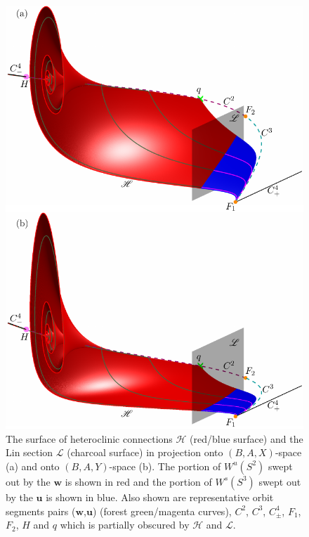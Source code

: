 \documentclass{ws-ijbc}
\begin{document}
\begin{figure}[H]
\centering
\includegraphics[]{./figures/MKMO_11.pdf}
\caption{The surface of heteroclinic connections $\mathscr{H}$ (red/blue surface) and the Lin section $\mathscr{L}$ (charcoal surface) in projection onto $(B,A,X)$-space (a) and onto $(B,A,Y)$-space (b).  The portion of $W^u(S^2)$ swept out by the $\mathbf{w}$ is shown in red and the portion of $W^s(S^3)$ swept out by the $\mathbf{u}$ is shown in blue.  Also shown are representative orbit segments pairs ($\mathbf{w}$,$\mathbf{u}$) (forest green/magenta curves), $C^2$, $C^3$, $C^4_\pm$, $F_1$, $F_2$, $H$ and $q$ which is partially obscured by $\mathscr{H}$ and $\mathscr{L}$.}
\label{figure_11}
\end{figure}
\end{document}
